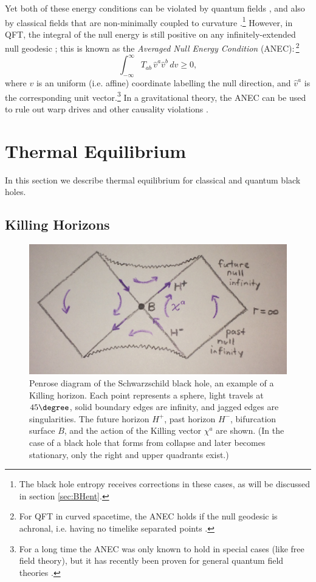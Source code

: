 \documentclass[12pt,a4paper]{article}
\def\be{\begin{equation}}
\def\ee{\end{equation}}
\begin{document}
\noindent Yet both of these energy conditions can be violated by quantum fields \cite{epstein1965nonpositivity}, and also by classical fields that are non-minimally coupled to curvature \cite{flanagan1996does}.\footnote{The black hole entropy receives corrections in these cases, as will be discussed in section \ref{sec:BHent}.}  However, in QFT, the integral of the null energy is still positive on any infinitely-extended null geodesic  \cite{borde1987geodesic}; this is known as the \emph{Averaged Null Energy Condition} (ANEC):\,\footnote{For QFT in curved spacetime, the ANEC holds if the null geodesic is achronal, i.e. having no timelike separated points \cite{graham2007achronal,Kontou:2015yha}.}
\be\label{ANEC}
\int_{-\infty}^{\infty} T_{ab} \,\hat{v}^a \hat{v}^b\,dv \ge 0,
\ee
where $v$ is an uniform (i.e. affine) coordinate labelling the null direction, and $\hat{v}^a$ is the corresponding unit vector.\footnote{For a long time the ANEC was only known to hold in special cases (like free field theory), but it has recently been proven for general quantum field theories \cite{Tom1,Tom2}.}  In a gravitational theory, the ANEC can be used to rule out warp drives and other causality violations \cite{Gao:2000ga}.

\section{Thermal Equilibrium} \label{sec:thermal}

In this section we describe thermal equilibrium for classical and quantum black holes.

\subsection{Killing Horizons} \label{sec:killing}

\begin{figure}[ht]
\centering
\includegraphics[width=.8\textwidth]{Killing.jpg}
\caption{\small Penrose diagram of the Schwarzschild black hole, an example of a Killing horizon.  Each point represents a sphere, light travels at $45\degree$, solid boundary edges are infinity, and jagged edges are singularities.  The future horizon $H^+$, past horizon $H^-$, bifurcation surface $B$, and the action of the Killing vector $\chi^a$ are shown.  (In the case of a black hole that forms from collapse and later becomes stationary, only the right and upper quadrants exist.)}\label{fig:Killing}
\end{figure}
\end{document}

